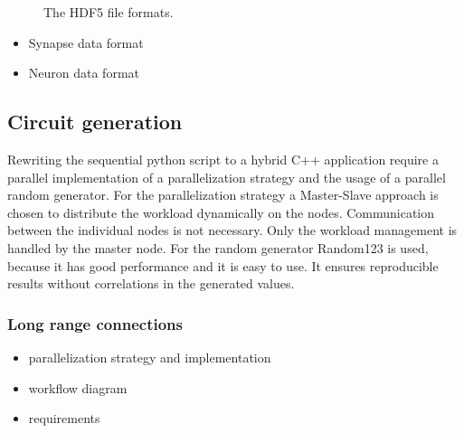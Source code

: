 \documentclass[a4paper]{article}
\begin{document}
\begin{figure}[ht!]
\begin{center}
{       }
    	   \end{center}
    	\caption{%
        The HDF5 file formats.
     }%
   \label{fig:atlas}
   \end{figure}

\begin{itemize}
      \item Synapse data format
      \item Neuron data format
\end{itemize}

\subsection{Circuit generation}
Rewriting the sequential python script to a hybrid C++ application require a parallel implementation of a parallelization strategy and the usage of 
a parallel random generator. For the parallelization strategy a Master-Slave approach is chosen to distribute the workload dynamically on the nodes.
Communication between the individual nodes is not necessary. Only the workload management is handled by the master node.
For the random generator Random123 is used, because it has good performance and it is easy to use.
It ensures reproducible results without correlations in the generated values. 


\subsubsection{Long range connections}


\begin{itemize}
      \item parallelization strategy and implementation
      \item workflow diagram
      \item requirements 
\end{itemize}
\end{document}
